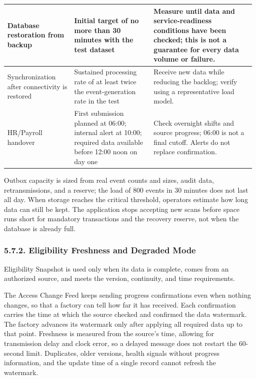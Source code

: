 \begin{longtable}{|>{\raggedright\arraybackslash}p{95.5pt}|>{\raggedright\arraybackslash}p{156.5pt}|>{\raggedright\arraybackslash}p{158.5pt}|}
\hline
Database restoration from backup & Initial target of no more than 30 minutes with the test dataset & Measure until data and service-readiness conditions have been checked; this is not a guarantee for every data volume or failure. \\
\hline
Synchronization after connectivity is restored & Sustained processing rate of at least twice the event-generation rate in the test & Receive new data while reducing the backlog; verify using a representative load model. \\*
\hline\noalign{\nobreak}
HR/Payroll handover & First submission planned at 06:00; internal alert at 10:00; required data available before 12:00 noon on day one & Check overnight shifts and source progress; 06:00 is not a final cutoff. Alerts do not replace confirmation. \\
\hline
\end{longtable}


Outbox capacity is sized from real event counts and sizes, audit data, retransmissions, and a reserve; the load of 800 events in 30 minutes does not last all day. When storage reaches the critical threshold, operators estimate how long data can still be kept. The application stops accepting new scans before space runs short for mandatory transactions and the recovery reserve, not when the database is already full.

\subsubsection*{5.7.2. Eligibility Freshness and Degraded Mode}

{}

Eligibility Snapshot is used only when its data is complete, comes from an authorized source, and meets the version, continuity, and time requirements.


The Access Change Feed keeps sending progress confirmations even when nothing changes, so that a factory can tell how far it has received. Each confirmation carries the time at which the source checked and confirmed the data watermark. The factory advances its watermark only after applying all required data up to that point. Freshness is measured from the source's time, allowing for transmission delay and clock error, so a delayed message does not restart the 60-second limit. Duplicates, older versions, health signals without progress information, and the update time of a single record cannot refresh the watermark.


